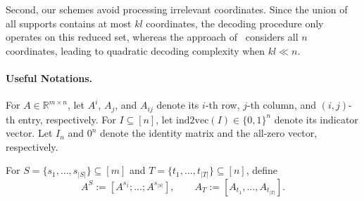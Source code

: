 \documentclass[10pt,a4paper]{amsart}
\newcommand{\xl}[1]{{\color{blue}#1}}
\newcommand{\supp}{\mathrm{supp}}
\begin{document}
Second, our schemes avoid processing irrelevant coordinates. Since the union of all supports contains at most $kl$ coordinates, the decoding procedure only operates on this reduced set, whereas the approach of~\cite{gandikota2020recovery} considers all $n$ coordinates, leading to quadratic decoding complexity when $kl\ll n$.








\paragraph{Useful Notations.}
For $A\in\mathbb{R}^{m\times n}$, let $A^i$, $A_j$, and $A_{ij}$ denote its $i$-th row, $j$-th column, and $(i,j)$-th entry, respectively. For $I\subseteq[n]$, let $\mathrm{ind2vec}(I)\in\{0,1\}^n$ denote its indicator vector. Let $I_n$ and $0^n$ denote the identity matrix and the all-zero vector, respectively.

For $S=\{s_1,\dots,s_{|S|}\}\subseteq[m]$ and $T=\{t_1,\dots,t_{|T|}\}\subseteq[n]$, define
\[
A^S:=[A^{s_1};\dots;A^{s_{|S|}}],
\qquad
A_T:=[A_{t_1},\dots,A_{t_{|T|}}].
\]
\end{document}
